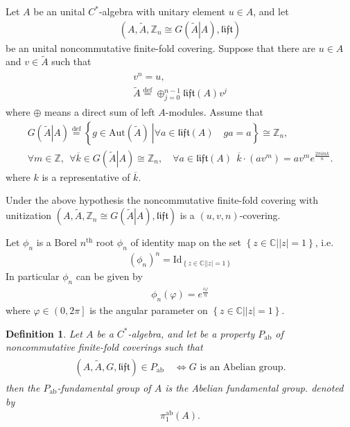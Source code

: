 \documentclass{beamer}
\theoremstyle{plain}
\newtheorem{defn}{Definition}
\newcommand{\C}{\mathbb{C}}
\newcommand{\Z}{\mathbb{Z}}                  %
\newcommand{\lift}{\mathfrak{lift}}
\newcommand{\Id}{\mathrm{Id}}
\newcommand{\Aut}{\mathrm{Aut}}
\newcommand{\bean}{\begin{eqnarray*}}
\newcommand{\eean}{\end{eqnarray*}}
\newcommand{\bydef}{\stackrel{\mathrm{def}}{=}}
\begin{document}
\begin{frame}
Let $A$ be an unital $C^*$-algebra with unitary element $u\in A$, and let
\bean
\left(   A , \widetilde A, \Z_n\cong G\left( \left.\widetilde A\right| A\right) ,  \lift \right) 
\eean
be an unital noncommutative finite-fold  covering.  Suppose that there are  $u \in A$ and $v \in \widetilde A$ such that
\bean
\begin{split}
	v^n = u,\\
	\widetilde A\bydef \oplus_{j = 0}^{n-1} \lift \left(A\right)  v^j
\end{split}
\eean
where $\oplus$ means a direct sum of left $A$-modules.
Assume that 
\bean
G\left( \left.\widetilde A\right| A\right) \bydef \left\{ \left.g \in \Aut\left(\widetilde{A} \right)~\right|\forall a \in  \lift\left( A\right)  \quad ga = a\right\} \cong \Z_n,
\\
\forall  m  \in \Z, ~~ \forall \overline k \in 	G\left( \left.\widetilde A\right| A\right)\cong\Z_n,\quad  \forall a \in  \lift\left(  A\right)~~ \overline k \cdot \left(a v^m \right) =  a v^m  e^{\frac{2\pi i m k}{n}}.
\eean
where $k$ is a representative of $\overline k$.
\begin{definition}
	Under the above hypothesis   the  noncommutative finite-fold covering with unitization $\left(   A , \widetilde A, \Z_n\cong G\left( \left.\widetilde A\right| A\right) ,  \lift \right)$ is a \alert{$\left(u, v, n\right)$-covering}.
\end{definition}

\end{frame}
\begin{frame}
	Let $\phi_n$ is a Borel $n^{\mathrm{th}}$ root $\phi_n$ of identity map on the set $\left\{\left. z \in \C\right| \left|z \right|=1\right\}$, i.e.
\bean
\left( \phi_n\right)^n = \Id_{\left\{\left. z \in \C\right| \left|z \right|=1\right\}}
\eean
In particular $\phi_n$ can be given by	
\bean
\phi_n\left( \varphi\right)= e^{\frac{i \varphi}{n}} 
\eean
where $\varphi\in \left(0, 2\pi\right]$ is the angular parameter on $\left\{\left. z \in \C\right| \left|z \right|=1\right\}$.
\end{frame}
\begin{frame}
\begin{defn}
	Let $A$ be a $C^*$-algebra, and let be a property $P_{\mathrm{ab}}$ of noncommutative finite-fold coverings such that
	\bean
	\begin{split}
		\left(A, \widetilde A, G, \lift \right) \in P_{\mathrm{ab}}\quad  \Leftrightarrow G \text{ is an Abelian group}.
	\end{split}
	\eean
	then the $P_{\mathrm{ab}}$-fundamental group of $A$ is the \alert{Abelian fundamental group}. denoted by
	\bean
	\pi_1^{\text{ab}}\left(A \right). 
	\eean
	\end{defn}

\end{frame}
\end{document}
